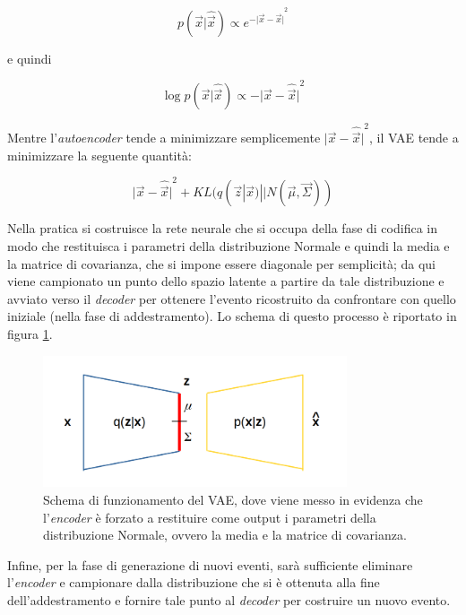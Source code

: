 \begin{equation}
	p(\vec{x}|\hat{\vec{x}}) \propto e^{{-{\lvert \vec{x}-\hat{\vec{x}}} \rvert}^2}
\end{equation}

e quindi

\begin{equation}
	\log p(\vec{x}|\hat{\vec{x}}) \propto -{\lvert \vec{x}-\hat{\vec{x}} \rvert}^2
\end{equation}

Mentre l'\textit{autoencoder} tende a minimizzare semplicemente ${\lvert \vec{x}-\hat{\vec{x}} \rvert}^2$, il VAE tende a minimizzare la seguente quantità:

\begin{equation}
	{\lvert \vec{x}-\hat{\vec{x}} \rvert}^2 + KL (q(\vec{z}|\vec{x})||N(\vec{\mu},\vec{\Sigma}))
\end{equation}

Nella pratica si costruisce la rete neurale che si occupa della fase di codifica in modo che restituisca i parametri della distribuzione Normale e quindi la media e la matrice di covarianza, che si impone essere diagonale per semplicità; da qui viene campionato un punto dello spazio latente a partire da tale distribuzione e avviato verso il \textit{decoder} per ottenere l'evento ricostruito da confrontare con quello iniziale (nella fase di addestramento). Lo schema di questo processo è riportato in figura \ref{schemaVAEs}.
\newpage

\begin{figure}[h!]
	\centering		\includegraphics[width=0.80\textwidth]{figs/VAEgauss.png}
	\caption{Schema di funzionamento del VAE, dove viene messo in evidenza che l'\textit{encoder} è forzato a restituire come output i parametri della distribuzione Normale, ovvero la media e la matrice di covarianza.}
	\label{schemaVAEs}
\end{figure}


Infine, per la fase di generazione di nuovi eventi, sarà sufficiente eliminare l'\textit{encoder} e campionare dalla distribuzione che si è ottenuta alla fine dell'addestramento e fornire tale punto al \textit{decoder} per costruire un nuovo evento.

\newpage